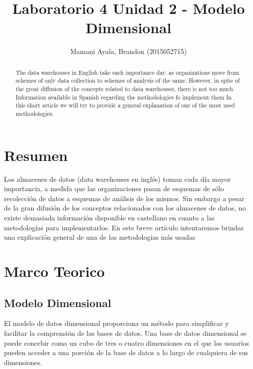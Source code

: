 \documentclass[preprint,12pt]{elsarticle}
\begin{document}
	
	\begin{frontmatter}
		
		
		\title{\huge Laboratorio 4 Unidad 2 - Modelo Dimensional}
		
		\author{Mamani Ayala, Brandon        (2015052715)}

		\address{Tacna, Perú}
		
		\begin{abstract}
			
The data warehouses in English take each importance day, as organizations move from schemes of only data collection to schemes of analysis of the same. However, in spite of the great diffusion of the concepts related to data warehouses, there is not too much Information available in Spanish regarding the methodologies fo implement them In this short article we will try to provide a general explanation of one of the most used methodologies. 
		\end{abstract}
\end{frontmatter}

	
	
	\section{Resumen}
Los almacenes de datos (data warehouses en inglés) toman cada día mayor importancia, a medida que las organizaciones pasan de esquemas de sólo recolección de datos a esquemas de análisis de los mismos. Sin embargo a pesar de la gran difusión de los conceptos relacionados con los almacenes de datos, no existe demasiada información disponible en castellano en cuanto a las metodologías para implementarlos. En este breve artículo intentaremos brindar una explicación general de una de las metodologías más usadas \\
	
	



	
	

\section{Marco Teorico}
\subsection{Modelo Dimensional}
El modelo de datos dimensional proporciona un método para simplificar y facilitar la comprensión de las bases de datos. Una base de datos dimensional se puede concebir como un cubo de tres o cuatro dimensiones en el que los usuarios pueden acceder a una porción de la base de datos a lo largo de cualquiera de sus dimensiones.\\
\end{document}
